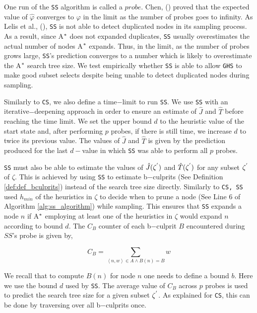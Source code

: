 One run of the \texttt{SS} algorithm is called a $probe$. Chen,  (\citeyear{chen1992heuristic}) proved that the expected value of $\hat{\varphi}$ converges to $\varphi$ in the limit as the number of probes goes to infinity. As Lelis et al., (\citeyear{lelis2014estimating}), \texttt{SS} is not able to detect duplicated nodes in its sampling process. As a result, since A$\sp{*}$ does not expanded duplicates, \texttt{SS} usually overestimates the actual number of nodes A$\sp{*}$ expands. Thus, in the limit, as the number of probes grows large, \texttt{SS}'s prediction converges to a number which  is likely to overestimate the A$\sp{*}$ search tree size. We test empirically whether \texttt{SS} is able to allow \texttt{GHS} to make good subset selects despite being unable to detect duplicated nodes during sampling.

Similarly to \texttt{CS}, we also define a time$-$limit to run \texttt{SS}. We use \texttt{SS} with an iterative$-$deepening approach in order to ensure an estimate of $\hat{J}$ and $\hat{T}$ before reaching the time limit. We set the upper bound $d$ to the heuristic value of the start state and, after performing $p$ probes, if there is still time, we increase $d$ to twice its previous value. The values of $\hat{J}$ and $\hat{T}$ is given by the prediction produced for the last $d-$value in which \texttt{SS} was able to perform all $p$ probes.

\texttt{SS} must also be able to estimate the values of $\hat{J}(\zeta\sp{'})$ and $\hat{T}(\zeta\sp{'})$ for any subset $\zeta\sp{'}$ of $\zeta$. This is achieved by using \texttt{SS} to estimate b$-$culprits (See Definition \ref{def:def_bculprits}) instead of the search tree size directly. Similarly to \texttt{CS, SS} used $h_{min}$ of the heuristics in $\zeta$ to decide when to prune a node (See Line 6 of Algorithm \ref{alg:ss_algorithm}) while sampling. This ensures that \texttt{SS} expands a node $n$ if A$\sp{*}$ employing at least one of the heuristics in $\zeta$ would expand $n$ according to bound $d$. The $C_{B}$ counter of each b$-$culprit $B$ encountered during $SS$'s probe is given by,

\begin{equation}
C_{B} = \sum_{\left\langle n,w \right\rangle \in A \wedge B(n) = B}w
\label{eq:eq_CB}
\end{equation}

We recall that to compute $B(n)$ for node $n$ one needs to define a bound $b$. Here we use the bound $d$ used by \texttt{SS}. The average value of $C_{B}$ across $p$ probes is used to predict the search tree size for a given subset $\zeta\sp{'}$. As explained for \texttt{CS}, this can be done by traversing over all b$-$culprits once.

